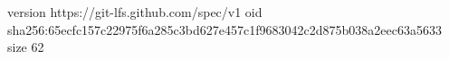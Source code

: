 version https://git-lfs.github.com/spec/v1
oid sha256:65ecfc157c22975f6a285c3bd627e457c1f9683042c2d875b038a2eec63a5633
size 62
